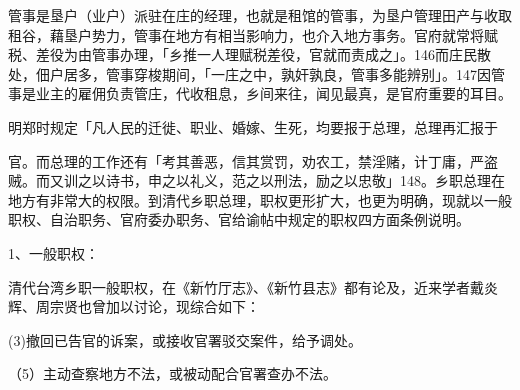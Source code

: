 
\noindent 管事是垦户（业户）派驻在庄的经理，也就是租馆的管事，为垦户管理田产与收取租谷，藉垦户势力，管事在地方有相当影响力，也介入地方事务。官府就常将赋税、差役为由管事办理，「乡推一人理赋税差役，官就而责成之」。146而庄民散处，佃户居多，管事穿梭期间，「一庄之中，孰奸孰良，管事多能辨别」。147因管事是业主的雇佣负责管庄，代收租息，乡间来往，闻见最真，是官府重要的耳目。


\noindent 明郑时规定「凡人民的迁徙、职业、婚嫁、生死，均要报于总理，总理再汇报于

\vfill
\begin{BookNotes}
\end{BookNotes}

\noindent 官。而总理的工作还有「考其善恶，信其赏罚，劝农工，禁淫赌，计丁庸，严盗贼。而又训之以诗书，申之以礼义，范之以刑法，励之以忠敬」148。乡职总理在地方有非常大的权限。到清代乡职总理，职权更形扩大，也更为明确，现就以一般职权、自治职务、官府委办职务、官给谕帖中规定的职权四方面条例说明。

1、一般职权：

清代台湾乡职一般职权，在《新竹厅志》、《新竹县志》都有论及，近来学者戴炎辉、周宗贤也曾加以讨论，现综合如下：



(3)撤回已告官的诉案，或接收官署驳交案件，给予调处。


（5）主动查察地方不法，或被动配合官署查办不法。




